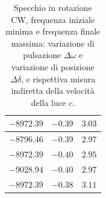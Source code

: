 \documentclass[]{article}
\begin{document}
\begin{table}
\begin{tabular}{||c|c|c||}
            $-8972.39$ & $-0.39$ & $3.03$ \\\hline
            $-8796.46$ & $-0.39$ & $2.97$ \\\hline
            $-8972.39$ & $-0.40$ & $2.95$ \\\hline
            $-9028.94$ & $-0.40$ & $2.97$ \\\hline
            $-8972.39$ & $-0.38$ & $3.11$ \\\hline
        \end{tabular}
        \caption{Specchio in rotazione CW, frequenza iniziale minima e frequenza finale massima: variazione di pulsazione $\Delta\omega$ e variazione di posizione $\Delta\delta$, e rispettiva misura indiretta della velocità della luce $c$.}
        \label{CW_min_max-c}
    \end{table}
\end{document}

